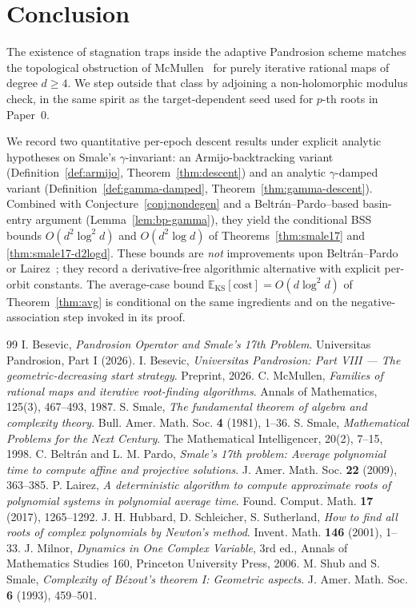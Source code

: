 \documentclass[11pt,a4paper]{article}
\begin{document}
\section{Conclusion}
The existence of stagnation traps inside the adaptive Pandrosion scheme matches the topological obstruction of McMullen~\cite{mcmullen} for purely iterative rational maps of degree $d \ge 4$. We step outside that class by adjoining a non-holomorphic modulus check, in the same spirit as the target-dependent seed used for $p$-th roots in Paper~0.

We record two quantitative per-epoch descent results under explicit analytic hypotheses on Smale's $\gamma$-invariant: an Armijo-backtracking variant (Definition~\ref{def:armijo}, Theorem~\ref{thm:descent}) and an analytic $\gamma$-damped variant (Definition~\ref{def:gamma-damped}, Theorem~\ref{thm:gamma-descent}). Combined with Conjecture~\ref{conj:nondegen} and a Beltr\'an--Pardo--based basin-entry argument (Lemma~\ref{lem:bp-gamma}), they yield the conditional BSS bounds $O(d^2 \log^2 d)$ and $O(d^2 \log d)$ of Theorems~\ref{thm:smale17} and \ref{thm:smale17-d2logd}. These bounds are \emph{not} improvements upon Beltr\'an--Pardo~\cite{beltranpardo} or Lairez~\cite{lairez}; they record a derivative-free algorithmic alternative with explicit per-orbit constants. The average-case bound $\mathbb{E}_{\text{KS}}[\text{cost}] = O(d \log^2 d)$ of Theorem~\ref{thm:avg} is conditional on the same ingredients and on the negative-association step invoked in its proof.

\begin{thebibliography}{99}
 I. Besevic, \textit{Pandrosion Operator and Smale's 17th Problem}. Universitas Pandrosion, Part I (2026).
 I. Besevic, \textit{Universitas Pandrosion: Part VIII --- The geometric-decreasing start strategy}. Preprint, 2026.
 C. McMullen, \textit{Families of rational maps and iterative root-finding algorithms}. Annals of Mathematics, 125(3), 467--493, 1987.
 S. Smale, \textit{The fundamental theorem of algebra and complexity theory}. Bull. Amer. Math. Soc. \textbf{4} (1981), 1--36.
 S. Smale, \textit{Mathematical Problems for the Next Century}. The Mathematical Intelligencer, 20(2), 7--15, 1998.
 C. Beltr\'an and L. M. Pardo, \textit{Smale's 17th problem: Average polynomial time to compute affine and projective solutions}. J. Amer. Math. Soc. \textbf{22} (2009), 363--385.
 P. Lairez, \textit{A deterministic algorithm to compute approximate roots of polynomial systems in polynomial average time}. Found. Comput. Math. \textbf{17} (2017), 1265--1292.
 J. H. Hubbard, D. Schleicher, S. Sutherland, \textit{How to find all roots of complex polynomials by Newton's method}. Invent. Math. \textbf{146} (2001), 1--33.
 J. Milnor, \textit{Dynamics in One Complex Variable}, 3rd ed., Annals of Mathematics Studies 160, Princeton University Press, 2006.
 M. Shub and S. Smale, \textit{Complexity of B\'ezout's theorem I: Geometric aspects}. J. Amer. Math. Soc. \textbf{6} (1993), 459--501.
\end{thebibliography}
\end{document}
